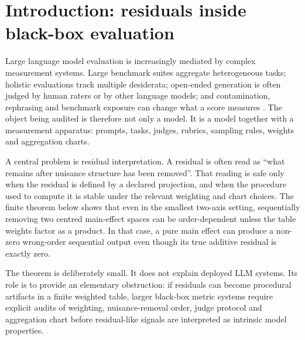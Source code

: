 \documentclass[11pt]{article}
\theoremstyle{remark}
\begin{document}
\section{Introduction: residuals inside black-box evaluation}

Large language model evaluation is increasingly mediated by complex measurement systems. Large benchmark suites aggregate heterogeneous tasks; holistic evaluations track multiple desiderata; open-ended generation is often judged by human raters or by other language models; and contamination, rephrasing and benchmark exposure can change what a score measures \cite{bigbench2022,helm2022,mtbench2023,geval2023,truthfulqa2021,selfcheckgpt2023,decodingtrust2023,llmevalsurvey2023,contamination2024,rethinkingcontamination2023}. The object being audited is therefore not only a model. It is a model together with a measurement apparatus: prompts, tasks, judges, rubrics, sampling rules, weights and aggregation charts.

A central problem is residual interpretation. A residual is often read as ``what remains after nuisance structure has been removed''. That reading is safe only when the residual is defined by a declared projection, and when the procedure used to compute it is stable under the relevant weighting and chart choices. The finite theorem below shows that even in the smallest two-axis setting, sequentially removing two centred main-effect spaces can be order-dependent unless the table weights factor as a product. In that case, a pure main effect can produce a non-zero wrong-order sequential output even though its true additive residual is exactly zero.

The theorem is deliberately small. It does not explain deployed LLM systems. Its role is to provide an elementary obstruction: if residuals can become procedural artifacts in a finite weighted table, larger black-box metric systems require explicit audits of weighting, nuisance-removal order, judge protocol and aggregation chart before residual-like signals are interpreted as intrinsic model properties.
\end{document}
